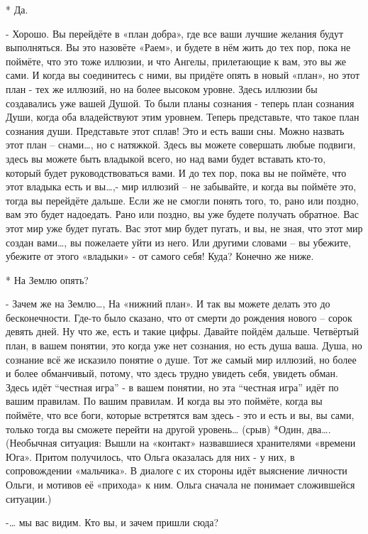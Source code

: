 * Да.

- Хорошо. Вы перейдёте в «план добра», где все ваши лучшие желания будут выполняться. Вы это назовёте «Раем», и будете в нём жить до тех пор, пока не поймёте, что это тоже иллюзии, и что Ангелы, прилетающие к вам, это вы же сами. И когда вы соединитесь с ними, вы придёте опять в новый «план», но этот план - тех же иллюзий, но на более высоком уровне. Здесь иллюзии бы создавались уже вашей Душой. То были планы сознания - теперь план сознания Души, когда оба владействуют этим уровнем. Теперь представьте, что такое план сознания души. Представьте этот сплав! Это и есть ваши сны. Можно назвать этот план – снами…, но с натяжкой. Здесь вы можете совершать любые подвиги, здесь вы можете быть владыкой всего, но над вами будет вставать кто-то, который будет руководствоваться вами. И до тех пор, пока вы не поймёте, что этот владыка есть и вы…,-  мир иллюзий – не забывайте, и когда вы поймёте это, тогда вы перейдёте дальше. Если же не смогли понять того, то, рано или поздно, вам это будет надоедать. Рано или поздно, вы уже будете получать обратное. Вас этот мир уже будет пугать. Вас этот мир будет пугать, и вы, не зная, что этот мир создан вами…, вы пожелаете уйти из него. Или другими словами – вы убежите, убежите от этого «владыки» - от самого себя! Куда? Конечно же ниже.

* На Землю опять?

- Зачем же на Землю…, На «нижний план». И так вы можете делать это до бесконечности. Где-то было сказано, что от смерти до рождения нового – сорок девять дней. Ну что же, есть и такие цифры. Давайте пойдём дальше. Четвёртый план, в вашем понятии, это когда уже нет сознания, но есть душа ваша. Душа, но сознание всё же исказило понятие о душе. Тот же самый мир иллюзий, но более и более обманчивый, потому, что здесь трудно увидеть себя, увидеть обман. Здесь идёт “честная игра” - в вашем понятии, но эта “честная игра” идёт по вашим правилам. По вашим правилам. И когда вы это поймёте, когда вы поймёте, что все боги, которые встретятся вам здесь - это и есть и вы, вы сами, только тогда вы сможете перейти на другой уровень… 
(срыв)
*Один, два….
(Необычная ситуация: Вышли на «контакт» назвавшиеся хранителями «времени Юга». Притом получилось, что Ольга оказалась для них - у них, в сопровождении «мальчика». В диалоге с их стороны идёт выяснение личности Ольги, и мотивов её «прихода» к ним. Ольга сначала не понимает сложившейся ситуации.)

-… мы вас видим. Кто вы, и зачем пришли сюда?

